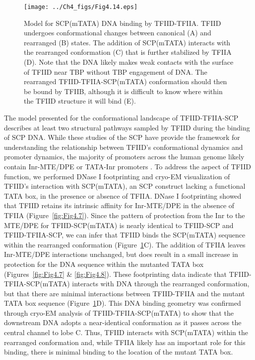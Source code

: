 \begin{figure}
\centering
\texttt{[image: ../Ch4\_figs/Fig4.14.eps]}
\caption[Model for SCP(mTATA) DNA binding by TFIID-TFIIA]{Model for SCP(mTATA) DNA binding by TFIID-TFIIA. TFIID undergoes conformational changes between canonical (A) and rearranged (B) states. The addition of SCP(mTATA) interacts with the rearranged conformation (C) that is further stabilized by TFIIA (D). Note that the DNA likely makes weak contacts with the surface of TFIID near TBP without TBP engagement of DNA. The rearranged TFIID-TFIIA-SCP(mTATA) conformation should then be bound by TFIIB, although it is difficult to know where within the TFIID structure it will bind (E).}
\label{fig:Fig4.14}
\end{figure}

The model presented for the conformational landscape of TFIID-TFIIA-SCP describes at least two structural pathways sampled by TFIID during the binding of SCP DNA. While these studies of the SCP have provide the framework for understanding the relationship between TFIID's conformational dynamics and promoter dynamics, the majority of promoters across the human genome likely contain Inr-MTE/DPE or TATA-Inr promoters \cite{Juven-Gershon_468}. To address the aspect of TFIID function, we performed DNase I footprinting and cryo-EM visualization of TFIID's interaction with SCP(mTATA), an SCP construct lacking a functional TATA box, in the presence or absence of TFIIA. DNase I footprinting showed that TFIID retains its intrinsic affinity for Inr-MTE/DPE in the absence of TFIIA (Figure~\ref{fig:Fig4.7}). Since the pattern of protection from the Inr to the MTE/DPE for TFIID-SCP(mTATA) is nearly identical to TFIID-SCP and TFIID-TFIIA-SCP, we can infer that TFIID binds the SCP(mTATA) sequence within the rearranged conformation (Figure~\ref{fig:Fig4.14}C). The addition of TFIIA leaves Inr-MTE/DPE interactions unchanged, but does result in a small increase in protection for the DNA sequence within the mutanted TATA box (Figures~\ref{fig:Fig4.7} \& \ref{fig:Fig4.8}). These footprinting data indicate that TFIID-TFIIA-SCP(mTATA) interacts with DNA through the rearranged conformation, but that there are minimal interactions between TFIID-TFIIA and the mutant TATA box sequence (Figure~\ref{fig:Fig4.14}D). This DNA binding geometry was confirmed through cryo-EM analysis of TFIID-TFIIA-SCP(mTATA) to show that the downstream DNA adopts a near-identical conformation as it passes across the central channel to lobe C. Thus, TFIID interacts with SCP(mTATA) within the rearranged conformation and, while TFIIA likely has an important role for this binding, there is minimal binding to the location of the mutant TATA box.  \\
